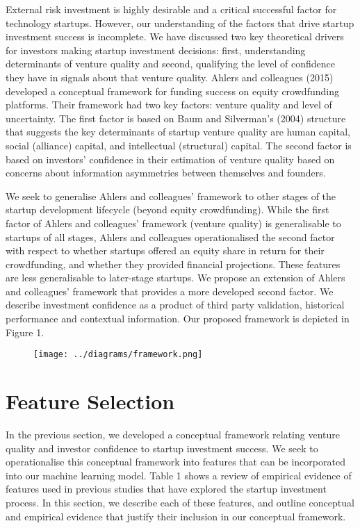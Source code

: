 \documentclass[../thesis/thesis.tex]{subfiles}
\begin{document}
External risk investment is highly desirable and a critical successful factor for technology startups. However, our understanding of the factors that drive startup investment success is incomplete. We have discussed two key theoretical drivers for investors making startup investment decisions: first, understanding determinants of venture quality and second, qualifying the level of confidence they have in signals about that venture quality. Ahlers and colleagues (2015) \cite{ahlers2015} developed a conceptual framework for funding success on equity crowdfunding platforms. Their framework had two key factors: venture quality and level of uncertainty. The first factor is based on Baum and Silverman's (2004) \cite{baum2004} structure that suggests the key determinants of startup venture quality are human capital, social (alliance) capital, and intellectual (structural) capital. The second factor is based on investors' confidence in their estimation of venture quality based on concerns about information asymmetries between themselves and founders.

We seek to generalise Ahlers and colleagues' \cite{ahlers2015} framework to other stages of the startup development lifecycle (beyond equity crowdfunding). While the first factor of Ahlers and colleagues' framework (venture quality) is generalisable to startups of all stages, Ahlers and colleagues operationalised the second factor with respect to whether startups offered an equity share in return for their crowdfunding, and whether they provided financial projections. These features are less generalisable to later-stage startups. We propose an extension of Ahlers and colleagues' framework that provides a more developed second factor. We describe investment confidence as a product of third party validation, historical performance and contextual information. Our proposed framework is depicted in Figure 1.

\begin{figure}

\texttt{[image: ../diagrams/framework.png]}
\label{fig:litreview:theory:framework}

\end{figure}

\section{Feature Selection}
\label{sec:litreview:features}

In the previous section, we developed a conceptual framework relating venture quality and investor confidence to startup investment success. We seek to operationalise this conceptual framework into features that can be incorporated into our machine learning model. Table 1 shows a review of empirical evidence of features used in previous studies that have explored the startup investment process. In this section, we describe each of these features, and outline conceptual and empirical evidence that justify their inclusion in our conceptual framework.
\end{document}
